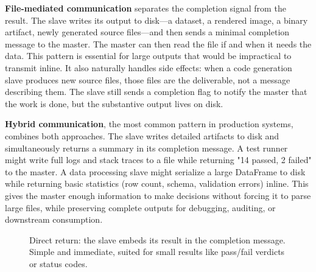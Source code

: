 \textbf{File-mediated communication} separates the completion signal from the result. The slave writes its output to disk—a dataset, a rendered image, a binary artifact, newly generated source files—and then sends a minimal completion message to the master. The master can then read the file if and when it needs the data. This pattern is essential for large outputs that would be impractical to transmit inline. It also naturally handles side effects: when a code generation slave produces new source files, those files are the deliverable, not a message describing them. The slave still sends a completion flag to notify the master that the work is done, but the substantive output lives on disk.

\textbf{Hybrid communication}, the most common pattern in production systems, combines both approaches. The slave writes detailed artifacts to disk and simultaneously returns a summary in its completion message. A test runner might write full logs and stack traces to a file while returning "14 passed, 2 failed" to the master. A data processing slave might serialize a large DataFrame to disk while returning basic statistics (row count, schema, validation errors) inline. This gives the master enough information to make decisions without forcing it to parse large files, while preserving complete outputs for debugging, auditing, or downstream consumption.

\begin{figure}[t]
\centering
{}
\caption{Direct return: the slave embeds its result in the completion message. Simple and immediate, suited for small results like pass/fail verdicts or status codes.}
\label{fig:comm_direct}
\end{figure}

